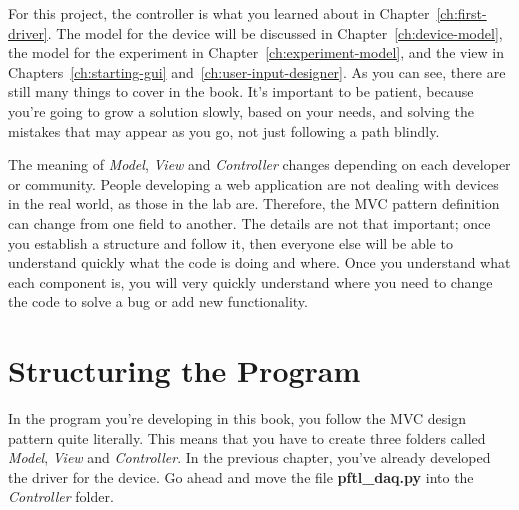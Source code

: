 For this project, the controller is what you learned about in Chapter~\ref{ch:first-driver}. The model for the device will be discussed in Chapter~\ref{ch:device-model}, the model for the experiment in Chapter~\ref{ch:experiment-model}, and the view in Chapters~\ref{ch:starting-gui} and~\ref{ch:user-input-designer}. As you can see, there are still many things to cover in the book. It's important to be patient, because you're going to grow a solution slowly, based on your needs, and solving the mistakes that may appear as you go, not just following a path blindly.


The meaning of \emph{Model}, \emph{View} and \emph{Controller} changes depending on each developer or community. People developing a web application are not dealing with devices in the real world, as those in the lab are. Therefore, the {MVC} pattern definition can change from one field to another. The details are not that important; once you establish a structure and follow it, then everyone else will be able to understand quickly what the code is doing and where. Once you understand what each component is, you will very quickly understand where you need to change the code to solve a bug or add new functionality.

\section{Structuring the Program}\label{sec:structure-of-theprogram}
In the program you're developing in this book, you follow the MVC design pattern quite literally. This means that you have to create three folders called \emph{Model}, \emph{View} and \emph{Controller}. In the previous chapter, you've already developed the driver for the device. Go ahead and move the file \textbf{pftl\_daq.py} into the \emph{Controller} folder.

